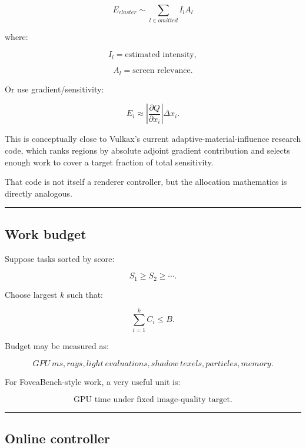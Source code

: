 \[
E_{cluster}
\sim
\sum_{l\in omitted}
I_l
A_l
\]

where:

\[
I_l=\text{estimated intensity},
\]

\[
A_l=\text{screen relevance}.
\]

Or use gradient/sensitivity:

\[
E_i
\approx
\left|
\frac{\partial Q}{\partial x_i}
\right|
\Delta x_i.
\]

This is conceptually close to Vulkax's current adaptive-material-influence research code, which ranks regions by absolute adjoint gradient contribution and selects enough work to cover a target fraction of total sensitivity.

That code is not itself a renderer controller, but the allocation mathematics is directly analogous.

\begin{center}\rule{0.5\linewidth}{0.5pt}\end{center}

\subsection{Work budget}\label{04-visual-computing-ii-ch040-work-budget}

\hypertarget{04-visual-computing-ii-ch040-work-budget}{}

Suppose tasks sorted by score:

\[
S_1\ge S_2\ge\cdots.
\]

Choose largest \(k\) such that:

\[
\boxed{
\sum_{i=1}^{k}C_i
\le B.
}
\]

Budget may be measured as:

\[
GPU\ ms,
rays,
light\ evaluations,
shadow\ texels,
particles,
memory.
\]

For FoveaBench-style work, a very useful unit is:

\[
\boxed{
\text{GPU time under fixed image-quality target}.
}
\]

\begin{center}\rule{0.5\linewidth}{0.5pt}\end{center}

\subsection{Online controller}\label{04-visual-computing-ii-ch040-online-controller}

\hypertarget{04-visual-computing-ii-ch040-online-controller}{}

